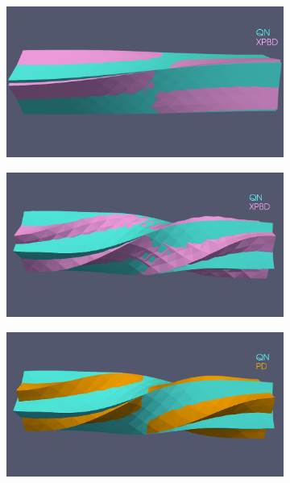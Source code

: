 \begin{figure}[h]
    \centering
    \begin{subfigure}{0.49\textwidth}
        \includegraphics[width=\textwidth, trim={0 5.0cm 0 2.5cm}, clip]{figures/strain_beam_untwist_QN_vs_XPBD.png}
    \end{subfigure}
    \hspace{0.001\textwidth}
    \begin{subfigure}{0.49\textwidth}
        \includegraphics[width=\textwidth, trim={0 4.5cm 0 2.15cm}, clip]{figures/strain_beam_untwist_QN_vs_XPBD_10_iterations.png}
    \end{subfigure}
    \par\medskip
    \begin{subfigure}{0.49\textwidth}
        \includegraphics[width=\textwidth, trim={0 4.5cm 0 2.15cm}, clip]{figures/strain_beam_untwist_QN_vs_PD_10_iterations.png}

\end{subfigure}
\end{figure}
